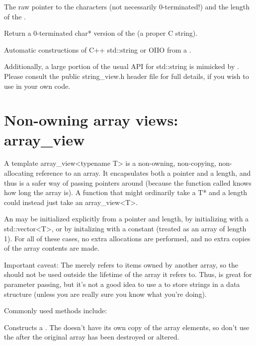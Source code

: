 The raw pointer to the characters (not necessarily 0-terminated!)
and the length of the \stringview.
\apiend

Return a 0-terminated {\cf char*} version of the \stringview (a proper C
string).
\apiend

Automatic constructions of C++ {\cf std::string} or OIIO \ustring from
a \stringview.
\apiend

\smallskip
\noindent Additionally, a large portion of the usual API for {\cf std::string}
is mimicked by \stringview.  Please consult the public {\cf string_view.h}
header file for full details, if you wish to use \stringview in your own
code.


\section{Non-owning array views: {\cf array_view}}
\label{sec:arrayview}

A {\cf template array\_view<typename T>} is a non-owning, non-copying, non-
allocating reference to an array.  It encapsulates both a pointer and a
length, and thus is a safer way of passing pointers around (because the
function called knows how long the array is). A function that might
ordinarily take a {\cf T*} and a length could instead just take an {\cf
array\_view<T>}.

An \arrayview may be initialized explicitly from a pointer and length, by
initializing with a {\cf std::vector<T>}, or by initalizing with a constant
(treated as an array of length 1). For all of these cases, no extra
allocations are performed, and no extra copies of the array contents are
made.

Important caveat: The \arrayview merely refers to items owned by another
array, so the \arrayview should not be used outside the lifetime of the
array it refers to. Thus, \arrayview is great for parameter passing, but
it's not a good idea to use a \arrayview to store strings in a data
structure (unless you are really sure you know what you're doing).

\noindent Commonly used \arrayview methods include:

Constructs a \arrayview.  The \arrayview doesn't have its own copy of the
array elements, so don't use the \arrayview after the original array has been
destroyed or altered.
\apiend

